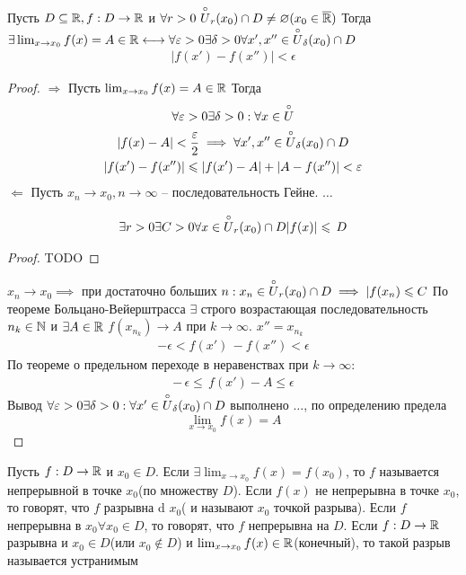 \begin{theorem}
	Пусть $ D \subseteq \mathbb{R}, f:D\to \mathbb{R} $ и $ \forall r > 0\ \overset{\circ}{U}_r(x_0) \cap D \neq  \varnothing(x_0 \in \overline{ \mathbb{R}}) $
	Тогда $ \exists \lim_{x\to x_0}f(x) = A \in \mathbb{R} \longleftrightarrow \forall  \varepsilon > 0 \exists \delta > 0 \forall x', x'' \in \overset{\circ}{U}_\delta(x_0)\cap D $
	 \begin{gather}
		|f(x') - f(x'')| < \epsilon
	\end{gather}
\end{theorem}
\begin{proof}
	 $ \Longrightarrow $
	Пусть $ \lim_{x \to  x_0}f(x) = A \in  \mathbb{R} $ Тогда \begin{gather}
		\forall \varepsilon > 0 \exists \delta > 0: \forall x \in \overset{\circ}{U} \\
		|f(x) - A| < \dfrac{\varepsilon}{2} \implies \forall x', x'' \in \overset{\circ}{U}_\delta (x_0)\cap D \\
		|f(x') - f(x'')| \leqslant |f(x') - A| + |A - f(x'')| < \varepsilon
	\end{gather}
	 $ \Longleftarrow $ Пусть $ x_n \to x_0, n \to \infty $ -- последовательность Гейне.
	 $ \dots  $ \begin{lemma}
	 \begin{gather}
		\exists r > 0 \exists C > 0 \forall x \in \overset{\circ}{U}_r(x_0)\cap D |f(x)| \leqslant\, D
	\end{gather}
\end{lemma}
	\begin{proof}
		TODO
	\end{proof}
	 $ x_n \to  x_0 \implies$ при достаточно больших $ n: x_n \in \overset{\circ}{U}_r(x_0) \cap D \implies  |f(x_n) \leqslant  C$
	 По теореме Больцано-Вейерштрасса $ \exists  $ строго возрастающая последовательность $ n_k \in \mathbb{N} $ и $ \exists  A \in \mathbb{R} $ $ f(x_{n_k}) \to A $ при $ k \to \infty $.
	 $ x'' = x_{n_k} $
	 \begin{gather}
		 - \epsilon < f(x')\, - f(x'') < \epsilon
	\end{gather}
	По теореме о предельном переходе в неравенствах при $ k \to  \infty $: \begin{gather}
		 -\, \epsilon \leq\, f(x') - A \leq \epsilon
	\end{gather}
	Вывод $ \forall \varepsilon > 0 \exists \delta > 0: \forall x' \in \overset{\circ}{U}_\delta(x_0) \cap D $ выполнено $ \dots  $, по определению предела \[ \lim_{x \to  x_0}f(x) = A \] 
\end{proof}
\begin{definition}
	Пусть $ f: D \to \mathbb{R} $ и $ x_0 \in D $. Если $ \exists \lim_{x \to x_0} f(x) = f(x_0)$, то $ f $ называется непрерывной в точке $ x_0 $(по множеству $ D $). Если $ f(x) $ не непрерывна в точке $ x_0 $,  то говорят, что $ f $ разрывна d $ x_0 $( и называют $ x_0 $ точкой разрыва).
	Если $ f $ непрерывна в $ x_0 \forall  x_0 \in  D $, то говорят, что $ f $ непрерывна на $ D $.
	Если $ f: D \to \mathbb{R} $ разрывна и $ x_0 \in D$(или $ x_0 \notin D $) и $ \lim_{x \to x_0}f(x) \in \mathbb{R} $(конечный), то такой разрыв называется устранимым
\end{definition}
